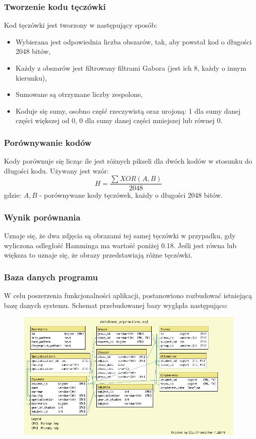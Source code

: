 \documentclass{beamer}
\begin{document}
\begin{frame}
\frametitle{Tworzenie kodu tęczówki}
Kod tęczówki jest tworzony w następujący sposób:
\begin{itemize}
\item Wybierana jest odpowiednia liczba obszarów, tak, aby powstał kod o długości 2048 bitów,
\item Każdy z obszarów jest filtrowany filtrami Gabora (jest ich 8, każdy o innym kierunku),
\item Sumowane są otrzymane liczby zespolone,
\item Koduje się sumy, osobno część rzeczywistą oraz urojoną: 1 dla sumy danej części większej od 0, 0 dla sumy danej części mniejszej lub równej 0.
\end{itemize}
\end{frame}


\begin{frame}
\frametitle{Porównywanie kodów}
Kody porównuje się licząc ile jest różnych pikseli dla dwóch kodów w stosunku do długości kodu. Używany jest wzór:
$$ H = \frac{\sum XOR(A,B)}{2048} $$
gdzie:
$A, B$ - porównywane kody tęczówek, każdy o długości 2048 bitów.\\
\end{frame}


\begin{frame}
\frametitle{Wynik porównania}
Uznaje się, że dwa zdjęcia są obrazami tej samej tęczówki w przypadku, gdy wyliczona odległość Hamminga ma wartość poniżej 0.18. Jeśli jest równa lub większa to uznaje się, że obrazy przedstawiają różne tęczówki.
\end{frame}

\begin{frame}
\frametitle{Baza danych programu}
W celu poszerzenia funkcjonalności aplikacji, postanowiono rozbudować istniejącą bazę danych systemu. Schemat przebudowanej bazy wygląda następująco:

\begin{figure}
\includegraphics[scale=0.3]{diagram.png}
\end{figure}
\end{frame}
\end{document}
